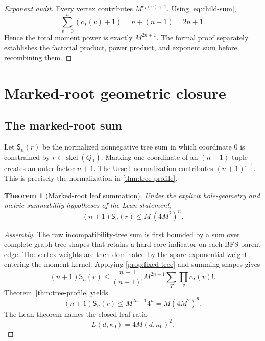 \documentclass[11pt]{article}
\newtheorem{theorem}{Theorem}[section]
\newcommand{\skel}{\operatorname{skel}}
\newcommand{\MarkedSum}{\mathsf S}
\begin{document}
\begin{proof}[Exponent audit]
Every vertex contributes $M^{c_T(v)+1}$.  Using \cref{eq:child-sum},
\[
  \sum_{v=0}^{n}(c_T(v)+1)=n+(n+1)=2n+1.
\]
Hence the total moment power is exactly $M^{2n+1}$.  The formal proof separately establishes the factorial product, power product, and exponent sum before recombining them.
\end{proof}

\section{Marked-root geometric closure}

\subsection{The marked-root sum}

Let $\MarkedSum_n(r)$ be the normalized nonnegative tree sum in which coordinate $0$ is constrained by $r\in\skel(Q_0)$.  Marking one coordinate of an $(n+1)$-tuple creates an outer factor $n+1$.  The Ursell normalization contributes $(n+1)!^{-1}$.  This is precisely the normalization in \cref{thm:tree-profile}.

\begin{theorem}[Marked-root leaf summation]\label{thm:marked-root}
Under the explicit hole-geometry and metric-summability hypotheses of the Lean statement,
\begin{equation}\label{eq:marked-root-main}
  (n+1)\MarkedSum_n(r)
  \le M\,(4M^2)^n.
\end{equation}
\end{theorem}

\begin{proof}[Assembly]
The raw incompatibility-tree sum is first bounded by a sum over complete-graph tree shapes that retains a hard-core indicator on each BFS parent edge.  The vertex weights are then dominated by the spare exponential weight entering the moment kernel.  Applying \cref{prop:fixed-tree} and summing shapes gives
\[
  (n+1)\MarkedSum_n(r)
  \le
  \frac{n+1}{(n+1)!}
  M^{2n+1}
  \sum_T\prod_vc_T(v)!.
\]
Theorem~\ref{thm:tree-profile} yields
\[
  (n+1)\MarkedSum_n(r)
  \le M^{2n+1}4^n
  =M(4M^2)^n.
\]
The Lean theorem names the closed leaf ratio
\begin{equation}\label{eq:leaf-constant}
  L(d,\kappa_0)=4M(d,\kappa_0)^2.
\end{equation}
\end{proof}
\end{document}
